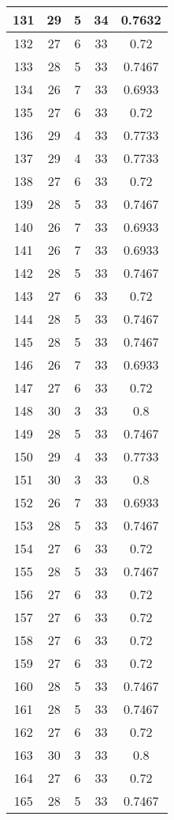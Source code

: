 \documentclass[letterpaper, 12pt]{article}
\begin{document}
\begin{longtable}{|c|c|c|c|c|}
\hline
131 & 29 & 5 & 34 & 0.7632 \\
\hline
132 & 27 & 6 & 33 & 0.72 \\
\hline
133 & 28 & 5 & 33 & 0.7467 \\
\hline
134 & 26 & 7 & 33 & 0.6933 \\
\hline
135 & 27 & 6 & 33 & 0.72 \\
\hline
136 & 29 & 4 & 33 & 0.7733 \\
\hline
137 & 29 & 4 & 33 & 0.7733 \\
\hline
138 & 27 & 6 & 33 & 0.72 \\
\hline
139 & 28 & 5 & 33 & 0.7467 \\
\hline
140 & 26 & 7 & 33 & 0.6933 \\
\hline
141 & 26 & 7 & 33 & 0.6933 \\
\hline
142 & 28 & 5 & 33 & 0.7467 \\
\hline
143 & 27 & 6 & 33 & 0.72 \\
\hline
144 & 28 & 5 & 33 & 0.7467 \\
\hline
145 & 28 & 5 & 33 & 0.7467 \\
\hline
146 & 26 & 7 & 33 & 0.6933 \\
\hline
147 & 27 & 6 & 33 & 0.72 \\
\hline
148 & 30 & 3 & 33 & 0.8 \\
\hline
149 & 28 & 5 & 33 & 0.7467 \\
\hline
150 & 29 & 4 & 33 & 0.7733 \\
\hline
151 & 30 & 3 & 33 & 0.8 \\
\hline
152 & 26 & 7 & 33 & 0.6933 \\
\hline
153 & 28 & 5 & 33 & 0.7467 \\
\hline
154 & 27 & 6 & 33 & 0.72 \\
\hline
155 & 28 & 5 & 33 & 0.7467 \\
\hline
156 & 27 & 6 & 33 & 0.72 \\
\hline
157 & 27 & 6 & 33 & 0.72 \\
\hline
158 & 27 & 6 & 33 & 0.72 \\
\hline
159 & 27 & 6 & 33 & 0.72 \\
\hline
160 & 28 & 5 & 33 & 0.7467 \\
\hline
161 & 28 & 5 & 33 & 0.7467 \\
\hline
162 & 27 & 6 & 33 & 0.72 \\
\hline
163 & 30 & 3 & 33 & 0.8 \\
\hline
164 & 27 & 6 & 33 & 0.72 \\
\hline
165 & 28 & 5 & 33 & 0.7467 \\

\end{longtable}
\end{document}
